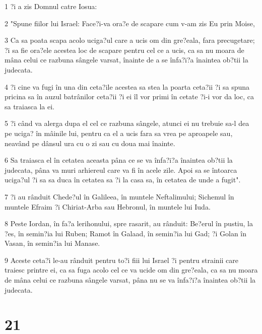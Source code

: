 \par 1 ?i a zis Domnul catre Iosua:
\par 2 "Spune fiilor lui Israel: Face?i-va ora?e de scapare cum v-am zis Eu prin Moise,
\par 3 Ca sa poata scapa acolo uciga?ul care a ucis om din gre?eala, fara precugetare; ?i sa fie ora?ele acestea loc de scapare pentru cel ce a ucis, ca sa nu moara de mâna celui ce razbuna sângele varsat, înainte de a se înfa?i?a înaintea ob?tii la judecata.
\par 4 ?i cine va fugi în una din ceta?ile acestea sa stea la poarta ceta?ii ?i sa spuna pricina sa în auzul batrânilor ceta?ii ?i ei îl vor primi în cetate ?i-i vor da loc, ca sa traiasca la ei.
\par 5 ?i când va alerga dupa el cel ce razbuna sângele, atunci ei nu trebuie sa-l dea pe uciga? în mâinile lui, pentru ca el a ucis fara sa vrea pe aproapele sau, neavând pe dânsul ura cu o zi sau cu doua mai înainte.
\par 6 Sa traiasca el în cetatea aceasta pâna ce se va înfa?i?a înaintea ob?tii la judecata, pâna va muri arhiereul care va fi în acele zile. Apoi sa se întoarca uciga?ul ?i sa sa duca în cetatea sa ?i la casa sa, în cetatea de unde a fugit".
\par 7 ?i au rânduit Chede?ul în Galileea, în muntele Neftalimului; Sichemul în muntele Efraim ?i Chiriat-Arba sau Hebronul, în muntele lui Iuda.
\par 8 Peste Iordan, în fa?a lerihonului, spre rasarit, au rânduit: Be?erul în pustiu, la ?es, în semin?ia lui Ruben; Ramot în Galaad, în semin?ia lui Gad; ?i Golan în Vasan, în semin?ia lui Manase.
\par 9 Aceste ceta?i le-au rânduit pentru to?i fiii lui Israel ?i pentru strainii care traiesc printre ei, ca sa fuga acolo cel ce va ucide om din gre?eala, ca sa nu moara de mâna celui ce razbuna sângele varsat, pâna nu se va înfa?i?a înaintea ob?tii la judecata.

\chapter{21}

